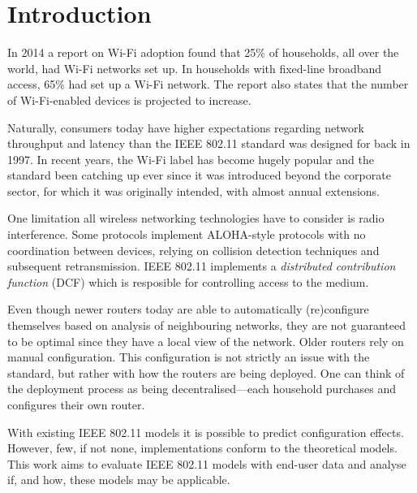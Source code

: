 \chapter{Introduction}

In 2014 a report on Wi-Fi adoption found that 25\% of households, all over the world, had Wi-Fi networks set up. In households with fixed-line broadband access, 65\% had set up a Wi-Fi network\cite{smith}. The report also states that the number of Wi-Fi-enabled devices is projected to increase. 

Naturally, consumers today have higher expectations regarding network throughput and latency than the IEEE 802.11 standard was designed for back in 1997. In recent years, the Wi-Fi label has become hugely popular and the standard been catching up ever since it was introduced beyond the corporate sector, for which it was originally intended, with almost annual extensions.

One limitation all wireless networking technologies have to consider is radio interference. Some protocols implement ALOHA-style protocols with no coordination between devices, relying on collision detection techniques and subsequent retransmission. IEEE 802.11 implements a \emph{distributed contribution function} (DCF) which is resposible for controlling access to the medium.

Even though newer routers today are able to automatically (re)configure themselves based on analysis of neighbouring networks, they are not guaranteed to be optimal since they have a local view of the network. Older routers rely on manual configuration. This configuration is not strictly an issue with the standard, but rather with how the routers are being deployed. One can think of the deployment process as being decentralised—each household purchases and configures their own router. 

With existing IEEE 802.11 models it is possible to predict configuration effects. However, few, if not none, implementations conform to the theoretical models. This work aims to evaluate IEEE 802.11 models with end-user data and analyse if, and how, these models may be applicable.





